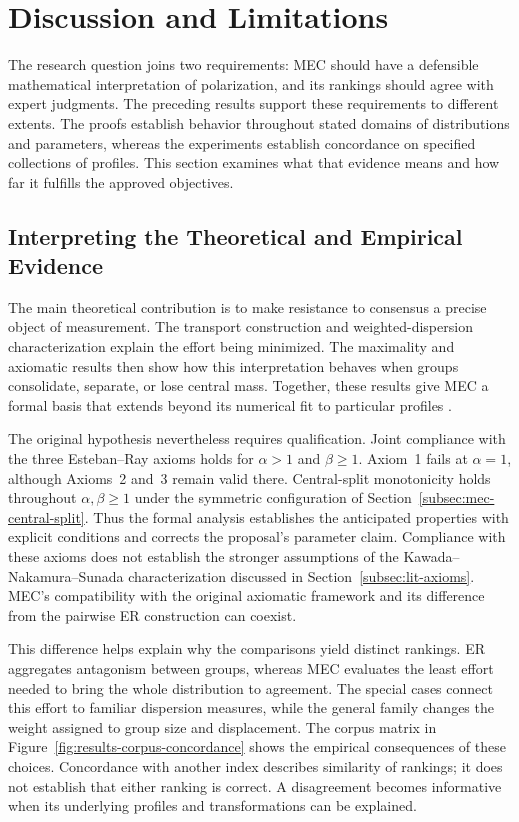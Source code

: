 \documentclass{article}
\theoremstyle{plain}
\theoremstyle{remark}
\begin{document}
\section{Discussion and Limitations}\label{sec:discussion}

The research question joins two requirements: MEC should have a defensible mathematical interpretation of polarization, and its rankings should agree with expert judgments. The preceding results support these requirements to different extents. The proofs establish behavior throughout stated domains of distributions and parameters, whereas the experiments establish concordance on specified collections of profiles. This section examines what that evidence means and how far it fulfills the approved objectives.

\subsection{Interpreting the Theoretical and Empirical Evidence}\label{subsec:discussion-evidence}

The main theoretical contribution is to make resistance to consensus a precise object of measurement. The transport construction and weighted-dispersion characterization explain the effort being minimized. The maximality and axiomatic results then show how this interpretation behaves when groups consolidate, separate, or lose central mass. Together, these results give MEC a formal basis that extends beyond its numerical fit to particular profiles \citep{aranda2026mec}.

The original hypothesis nevertheless requires qualification. Joint compliance with the three Esteban--Ray axioms holds for $\alpha>1$ and $\beta\geq1$. Axiom~1 fails at $\alpha=1$, although Axioms~2 and~3 remain valid there. Central-split monotonicity holds throughout $\alpha,\beta\geq1$ under the symmetric configuration of Section~\ref{subsec:mec-central-split}. Thus the formal analysis establishes the anticipated properties with explicit conditions and corrects the proposal's parameter claim. Compliance with these axioms does not establish the stronger assumptions of the Kawada--Nakamura--Sunada characterization discussed in Section~\ref{subsec:lit-axioms}. MEC's compatibility with the original axiomatic framework and its difference from the pairwise ER construction can coexist.

This difference helps explain why the comparisons yield distinct rankings. ER aggregates antagonism between groups, whereas MEC evaluates the least effort needed to bring the whole distribution to agreement. The special cases connect this effort to familiar dispersion measures, while the general family changes the weight assigned to group size and displacement. The corpus matrix in Figure~\ref{fig:results-corpus-concordance} shows the empirical consequences of these choices. Concordance with another index describes similarity of rankings; it does not establish that either ranking is correct. A disagreement becomes informative when its underlying profiles and transformations can be explained.
\end{document}
